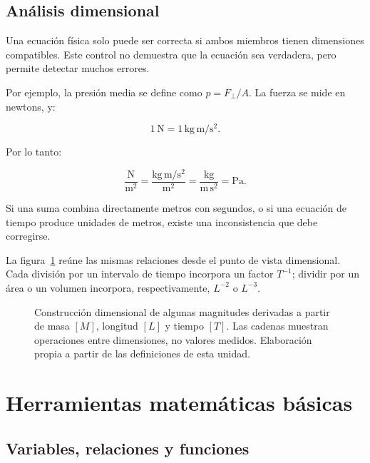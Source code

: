 \subsection{Análisis dimensional}
\label{sec:u1-analisis-dimensional}

Una ecuación física solo puede ser correcta si ambos miembros tienen dimensiones compatibles. Este control no demuestra que la ecuación sea verdadera, pero permite detectar muchos errores.

Por ejemplo, la presión media se define como \(p=F_\perp/A\). La fuerza se mide en newtons, y:

\[
    1\,\text{N}=1\,\text{kg}\,\text{m}/\text{s}^{2}.
\]

Por lo tanto:

\[
    \frac{\text{N}}{\text{m}^{2}}
    =\frac{\text{kg}\,\text{m}/\text{s}^{2}}{\text{m}^{2}}
    =\frac{\text{kg}}{\text{m}\,\text{s}^{2}}
    =\text{Pa}.
\]

Si una suma combina directamente metros con segundos, o si una ecuación de tiempo produce unidades de metros, existe una inconsistencia que debe corregirse.

La figura~\ref{fig:magnitudes-fundamentales-derivadas} reúne las mismas relaciones desde el punto de vista dimensional. Cada división por un intervalo de tiempo incorpora un factor \(T^{-1}\); dividir por un área o un volumen incorpora, respectivamente, \(L^{-2}\) o \(L^{-3}\).

\begin{figure}[htbp]
    \centering
    
    \caption{Construcción dimensional de algunas magnitudes derivadas a partir de masa \([M]\), longitud \([L]\) y tiempo \([T]\). Las cadenas muestran operaciones entre dimensiones, no valores medidos. Elaboración propia a partir de las definiciones de esta unidad.}
    \label{fig:magnitudes-fundamentales-derivadas}
\end{figure}

\section{Herramientas matemáticas básicas}
\label{sec:u1-herramientas}

\subsection{Variables, relaciones y funciones}
\label{sec:u1-funciones}

